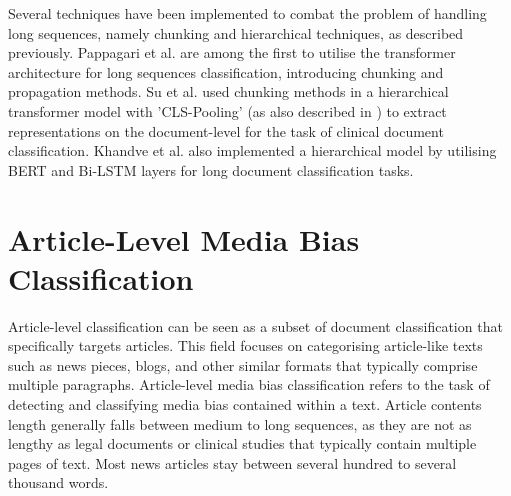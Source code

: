 Several techniques have been implemented to combat the problem of handling long sequences, namely chunking and hierarchical techniques, as described previously. Pappagari et al. \cite{pappagari-2019-hierarchical} are among the first to utilise the transformer architecture for long sequences classification, introducing chunking and propagation methods. Su et al. \cite{su-2021-classifying} used chunking methods in a hierarchical transformer model with 'CLS-Pooling' (as also described in \cite{adhikari-2019-docbert}) to extract representations on the document-level for the task of clinical document classification. Khandve et al. \cite{khandve-2022-hierarchical-longdoc} also implemented a hierarchical model by utilising BERT and Bi-LSTM layers for long document classification tasks.


\section{Article-Level Media Bias Classification}

Article-level classification can be seen as a subset of document classification that specifically targets articles. This field focuses on categorising article-like texts such as news pieces, blogs, and other similar formats that typically comprise multiple paragraphs. Article-level media bias classification refers to the task of detecting and classifying media bias contained within a text. Article contents length generally falls between medium to long sequences, as they are not as lengthy as legal documents or clinical studies that typically contain multiple pages of text. Most news articles stay between several hundred to several thousand words.

